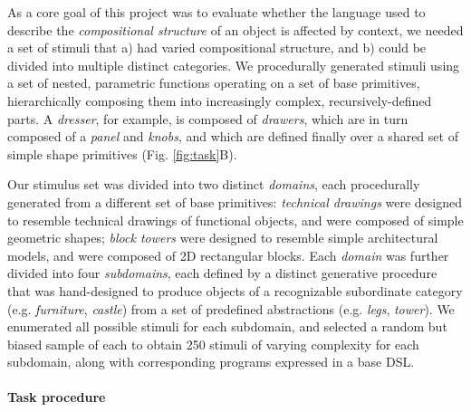 \documentclass[10pt,letterpaper]{article}
\begin{document}
As a core goal of this project was to evaluate whether the language used to describe the \textit{compositional structure} of an object is affected by context, we needed a set of stimuli that a) had varied compositional structure, and b) could be divided into multiple distinct categories. 
We procedurally generated stimuli using a set of nested, parametric functions operating on a set of base primitives, hierarchically composing them into increasingly complex, recursively-defined parts.
A \textit{dresser}, for example, is composed of \textit{drawers}, which are in turn composed of a \textit{panel} and \textit{knobs}, and which are defined finally over a shared set of simple shape primitives (Fig. \ref{fig:task}B).

Our stimulus set was divided into two distinct \textit{domains}, each procedurally generated from a different set of base primitives:
\textit{technical drawings} were designed to resemble technical drawings of functional objects, and were composed of simple geometric shapes; 
\textit{block towers} were designed to resemble simple architectural models, and were composed of 2D rectangular blocks.
Each \textit{domain} was further divided into four \textit{subdomains}, each defined by a distinct generative procedure that was hand-designed to produce objects of a recognizable subordinate category (e.g. \textit{furniture}, \textit{castle}) from a set of predefined abstractions (e.g. \textit{legs}, \textit{tower}).
We enumerated all possible stimuli for each subdomain, and selected a random but biased sample of each to obtain 250 stimuli of varying complexity for each subdomain, along with corresponding programs expressed in a base DSL.

\paragraph{Task procedure}
\end{document}
